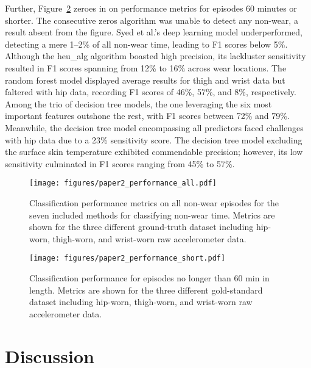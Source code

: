 \documentclass[
  10pt,
]{scrbook}
\begin{document}
Further, Figure~\ref{fig-paper2_performance_short} zeroes in on
performance metrics for episodes 60 minutes or shorter. The consecutive
zeros algorithm was unable to detect any non-wear, a result absent from
the figure. Syed et al.'s deep learning model underperformed, detecting
a mere 1--2\% of all non-wear time, leading to F1 scores below 5\%.
Although the \textsf{heu\_alg} algorithm boasted high precision, its
lackluster sensitivity resulted in F1 scores spanning from 12\% to 16\%
across wear locations. The random forest model displayed average results
for thigh and wrist data but faltered with hip data, recording F1 scores
of 46\%, 57\%, and 8\%, respectively. Among the trio of decision tree
models, the one leveraging the six most important features outshone the
rest, with F1 scores between 72\% and 79\%. Meanwhile, the decision tree
model encompassing all predictors faced challenges with hip data due to
a 23\% sensitivity score. The decision tree model excluding the surface
skin temperature exhibited commendable precision; however, its low
sensitivity culminated in F1 scores ranging from 45\% to 57\%.

\begin{figure}

{\centering \texttt{[image: figures/paper2\_performance\_all.pdf]}

}

\caption{\label{fig-paper2_performance_all}Classification performance
metrics on all non-wear episodes for the seven included methods for
classifying non-wear time. Metrics are shown for the three different
ground-truth dataset including hip-worn, thigh-worn, and wrist-worn raw
accelerometer data.}

\end{figure}

\begin{figure}

{\centering \texttt{[image: figures/paper2\_performance\_short.pdf]}

}

\caption{\label{fig-paper2_performance_short}Classification performance
for episodes no longer than 60 min in length. Metrics are shown for the
three different gold-standard dataset including hip-worn, thigh-worn,
and wrist-worn raw accelerometer data.}

\end{figure}

\hypertarget{discussion-1}{%
\section{Discussion}\label{discussion-1}}
\end{document}
